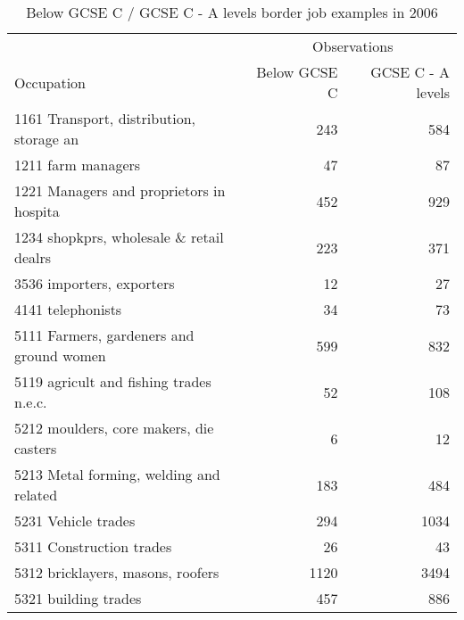 \begin{table}[h!]
	\centering
	\caption{Below GCSE C / GCSE C - A levels border job examples in 2006}
	\begin{tabular}{lrr}
	\toprule
	\toprule
	&\multicolumn{2}{c}{Observations}\\
	Occupation&Below GCSE C &GCSE C - A levels\\
\hline
1161 Transport, distribution, storage an&243&584 \\
1211 farm managers&47&87 \\
1221 Managers and proprietors in hospita&452&929 \\
1234 shopkprs, wholesale \& retail dealrs&223&371 \\
3536 importers, exporters&12&27 \\
4141 telephonists&34&73 \\
5111 Farmers, gardeners and ground women&599&832 \\
5119 agricult and fishing trades n.e.c.&52&108 \\
5212 moulders, core makers, die casters&6&12 \\
5213 Metal forming, welding and related &183&484 \\
5231 Vehicle trades&294&1034 \\
5311 Construction trades&26&43 \\
5312 bricklayers, masons, roofers&1120&3494 \\
5321 building trades&457&886 \\
\bottomrule
\bottomrule
\end{tabular}
\end{table}
